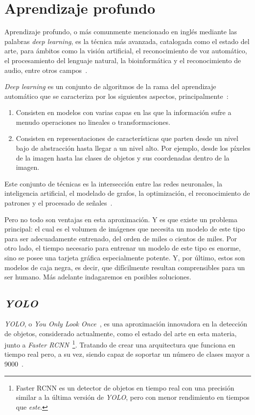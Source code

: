 \section{Aprendizaje profundo}

Aprendizaje profundo, o más comunmente mencionado en inglés mediante las palabras \textit{deep learning}, es la técnica más avanzada, catalogada como el estado del arte, para ámbitos como la visión artificial, el reconocimiento de voz automático, el procesamiento del lenguaje natural,  la bioinformática y el reconocimiento de audio, entre otros campos~\cite{ms:deeplearning}.

\textit{Deep learning} es un conjunto de algoritmos de la rama del aprendizaje automático que se caracteriza por los siguientes aspectos, principalmente~\cite{ms:deeplearning}:

\begin{enumerate}
	\item Consisten en modelos con varias capas en las que la información sufre a menudo operaciones no lineales o transformaciones.
	\item Consisten en representaciones de características que parten desde un nivel bajo de abstracción hasta llegar a un nivel alto. Por ejemplo, desde los píxeles de la imagen hasta las clases de objetos y sus coordenadas dentro de la imagen.
\end{enumerate}

Este conjunto de técnicas es la intersección entre las redes neuronales, la inteligencia artificial, el modelado de grafos, la optimización, el reconocimiento de patrones y el procesado de señales~\cite{ms:deeplearning}. %

Pero no todo son ventajas en esta aproximación. Y es que existe un problema principal: el cual es el volumen de imágenes que necesita un modelo de este tipo para ser adecuadamente entrenado, del orden de miles o cientos de miles. Por otro lado, el tiempo necesario para entrenar un modelo de este tipo es enorme, sino se posee una tarjeta gráfica especialmente potente. Y, por último, estos son modelos de caja negra, es decir, que difícilmente resultan comprensibles para un ser humano. Más adelante indagaremos en posibles soluciones.

\subsection{\textit{YOLO}}

\textit{YOLO}, o \textit{You Only Look Once}~\cite{yolo}, es una aproximación innovadora en la detección de objetos, considerado actualmente, como el estado del arte en esta materia, junto a \textit{Faster RCNN}~\cite{faster-rcnn}\footnote{Faster RCNN es un detector de objetos en tiempo real con una precisión similar a la última versión de \textit{YOLO}, pero con menor rendimiento en tiempos que \textit{este}.}. Tratando de crear una arquitectura que funciona en tiempo real pero, a su vez, siendo capaz de soportar un número de clases mayor a 9000~\cite{yolov2}.


